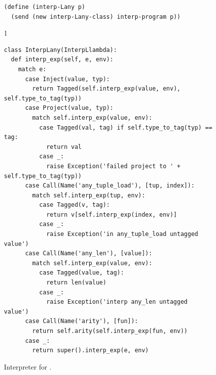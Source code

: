 \documentclass[7x10]{TimesAPriori_MIT}%
\def\pythonEd{1}
\providecommand{\BookEdition}{1}
\let\edition\BookEdition
\newcommand{\pythonColor}[0]{}
\numberwithin{theorem}{chapter}
\numberwithin{definition}{chapter}
\numberwithin{equation}{chapter}
\begin{document}
\begin{figure}[tbp]
\begin{tcolorbox}[colback=white]
{\begin{lstlisting}[basicstyle=\ttfamily\footnotesize]
(define (interp-Lany p)
  (send (new interp-Lany-class) interp-program p))
\end{lstlisting}
\fi}
{\if\edition\pythonEd\pythonColor
\begin{lstlisting}[basicstyle=\ttfamily\footnotesize]
class InterpLany(InterpLlambda):
  def interp_exp(self, e, env):
    match e:
      case Inject(value, typ):
        return Tagged(self.interp_exp(value, env), self.type_to_tag(typ))
      case Project(value, typ):
        match self.interp_exp(value, env):
          case Tagged(val, tag) if self.type_to_tag(typ) == tag:
            return val
          case _:
            raise Exception('failed project to ' + self.type_to_tag(typ))
      case Call(Name('any_tuple_load'), [tup, index]):
        match self.interp_exp(tup, env):
          case Tagged(v, tag):
            return v[self.interp_exp(index, env)]
          case _:
            raise Exception('in any_tuple_load untagged value')
      case Call(Name('any_len'), [value]):
        match self.interp_exp(value, env):
          case Tagged(value, tag):
            return len(value)
          case _:
            raise Exception('interp any_len untagged value')
      case Call(Name('arity'), [fun]):
        return self.arity(self.interp_exp(fun, env))
      case _:
        return super().interp_exp(e, env)
\end{lstlisting}
\fi}
  \end{tcolorbox}
\caption{Interpreter for \LangAny{}.}
\label{fig:interp-Lany}
\end{figure}
\end{document}
